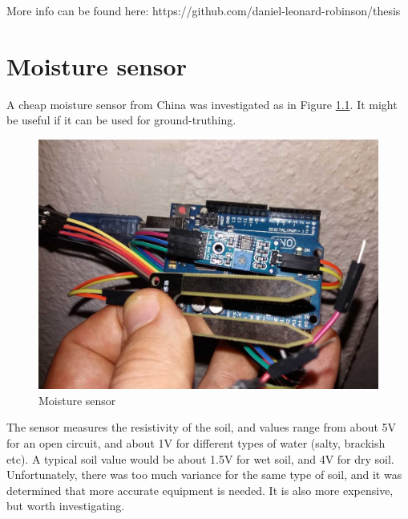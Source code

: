 \begin{appendices}

More info can be found here: https://github.com/daniel-leonard-robinson/thesis

%

\chapter{Moisture sensor}

A cheap moisture sensor from China was investigated as in Figure \ref{fig:moisture_sensor}. It might be useful if it can be used for ground-truthing.

\begin{figure}[H]
\centering
\includegraphics[scale=0.17]{images/moisture_sensor.jpg}
\caption{Moisture sensor}
\label{fig:moisture_sensor}
\end{figure}

The sensor measures the resistivity of the soil, and values range from about 5V for an open circuit, and about 1V for different types of water (salty, brackish etc). A typical soil value would be about 1.5V for wet soil, and 4V for dry soil. Unfortunately, there was too much variance for the same type of soil, and it was determined that more accurate equipment is needed. It is also more expensive, but worth investigating.


\end{appendices}
